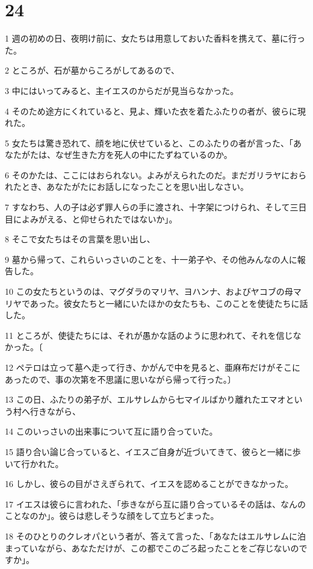 \chapter{24}

\par 1 週の初めの日、夜明け前に、女たちは用意しておいた香料を携えて、墓に行った。
\par 2 ところが、石が墓からころがしてあるので、
\par 3 中にはいってみると、主イエスのからだが見当らなかった。
\par 4 そのため途方にくれていると、見よ、輝いた衣を着たふたりの者が、彼らに現れた。
\par 5 女たちは驚き恐れて、顔を地に伏せていると、このふたりの者が言った、「あなたがたは、なぜ生きた方を死人の中にたずねているのか。
\par 6 そのかたは、ここにはおられない。よみがえられたのだ。まだガリラヤにおられたとき、あなたがたにお話しになったことを思い出しなさい。
\par 7 すなわち、人の子は必ず罪人らの手に渡され、十字架につけられ、そして三日目によみがえる、と仰せられたではないか」。
\par 8 そこで女たちはその言葉を思い出し、
\par 9 墓から帰って、これらいっさいのことを、十一弟子や、その他みんなの人に報告した。
\par 10 この女たちというのは、マグダラのマリヤ、ヨハンナ、およびヤコブの母マリヤであった。彼女たちと一緒にいたほかの女たちも、このことを使徒たちに話した。
\par 11 ところが、使徒たちには、それが愚かな話のように思われて、それを信じなかった。〔
\par 12 ペテロは立って墓へ走って行き、かがんで中を見ると、亜麻布だけがそこにあったので、事の次第を不思議に思いながら帰って行った。〕
\par 13 この日、ふたりの弟子が、エルサレムから七マイルばかり離れたエマオという村へ行きながら、
\par 14 このいっさいの出来事について互に語り合っていた。
\par 15 語り合い論じ合っていると、イエスご自身が近づいてきて、彼らと一緒に歩いて行かれた。
\par 16 しかし、彼らの目がさえぎられて、イエスを認めることができなかった。
\par 17 イエスは彼らに言われた、「歩きながら互に語り合っているその話は、なんのことなのか」。彼らは悲しそうな顔をして立ちどまった。
\par 18 そのひとりのクレオパという者が、答えて言った、「あなたはエルサレムに泊まっていながら、あなただけが、この都でこのごろ起ったことをご存じないのですか」。
